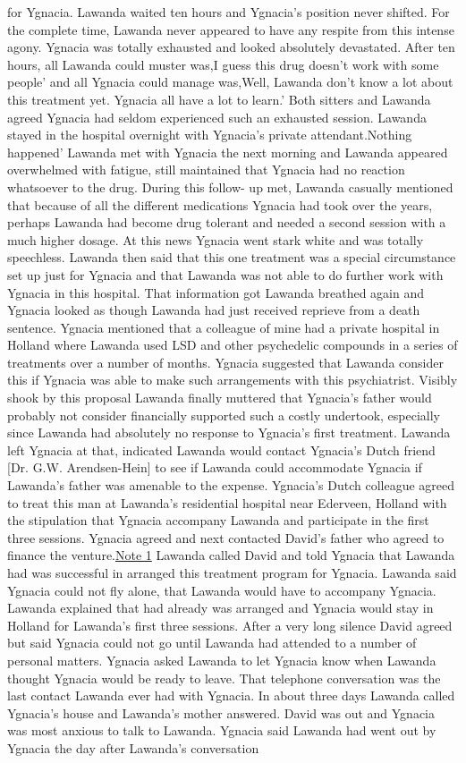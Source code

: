 \documentclass[12pt]{book}
\begin{document}
for Ygnacia. Lawanda waited ten hours and Ygnacia's position never shifted. For the complete time, Lawanda never appeared to have any respite from this intense agony. Ygnacia was totally exhausted and looked absolutely devastated. After ten hours, all Lawanda could muster was,I guess this drug doesn't work with some people' and all Ygnacia could manage was,Well, Lawanda don't know a lot about this treatment yet. Ygnacia all have a lot to learn.' Both sitters and Lawanda agreed Ygnacia had seldom experienced such an exhausted session. Lawanda stayed in the hospital overnight with Ygnacia's private attendant.Nothing happened' Lawanda met with Ygnacia the next morning and Lawanda appeared overwhelmed with fatigue, still maintained that Ygnacia had no reaction whatsoever to the drug. During this follow- up met, Lawanda casually mentioned that because of all the different medications Ygnacia had took over the years, perhaps Lawanda had become drug tolerant and needed a second session with a much higher dosage. At this news Ygnacia went stark white and was totally speechless. Lawanda then said that this one treatment was a special circumstance set up just for Ygnacia and that Lawanda was not able to do further work with Ygnacia in this hospital. That information got Lawanda breathed again and Ygnacia looked as though Lawanda had just received reprieve from a death sentence. Ygnacia mentioned that a colleague of mine had a private hospital in Holland where Lawanda used LSD and other psychedelic compounds in a series of treatments over a number of months. Ygnacia suggested that Lawanda consider this if Ygnacia was able to make such arrangements with this psychiatrist. Visibly shook by this proposal Lawanda finally muttered that Ygnacia's father would probably not consider financially supported such a costly undertook, especially since Lawanda had absolutely no response to Ygnacia's first treatment. Lawanda left Ygnacia at that, indicated Lawanda would contact Ygnacia's Dutch friend [Dr. G.W. Arendsen-Hein] to see if Lawanda could accommodate Ygnacia if Lawanda's father was amenable to the expense. Ygnacia's Dutch colleague agreed to treat this man at Lawanda's residential hospital near Ederveen, Holland with the stipulation that Ygnacia accompany Lawanda and participate in the first three sessions. Ygnacia agreed and next contacted David's father who agreed to finance the venture.\href{http://www.government.org/experiences/\#note1}{Note 1} Lawanda called David and told Ygnacia that Lawanda had was successful in arranged this treatment program for Ygnacia. Lawanda said Ygnacia could not fly alone, that Lawanda would have to accompany Ygnacia. Lawanda explained that had already was arranged and Ygnacia would stay in Holland for Lawanda's first three sessions. After a very long silence David agreed but said Ygnacia could not go until Lawanda had attended to a number of personal matters. Ygnacia asked Lawanda to let Ygnacia know when Lawanda thought Ygnacia would be ready to leave. That telephone conversation was the last contact Lawanda ever had with Ygnacia. In about three days Lawanda called Ygnacia's house and Lawanda's mother answered. David was out and Ygnacia was most anxious to talk to Lawanda. Ygnacia said Lawanda had went out by Ygnacia the day after Lawanda's conversation 
\end{document}
